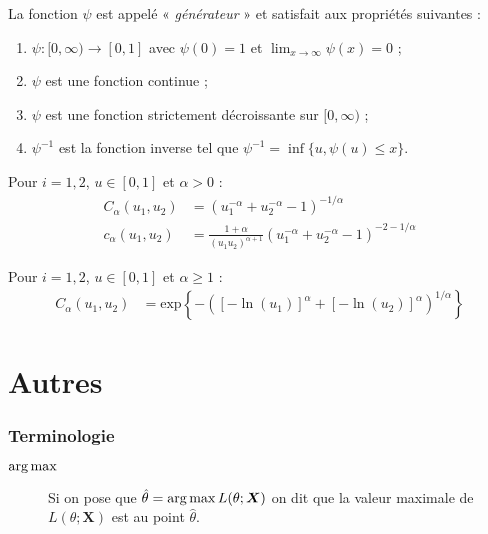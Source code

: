 \documentclass[10pt, french]{article}
\begin{document}
\begin{multicols*}{2}
\begin{definitionNOHFILL}
La fonction $\psi$ est appelé « \textit{générateur} » et satisfait aux propriétés suivantes :
\begin{enumerate}[label	=	\circled{\arabic*}{trueblue}]
	\item	$\psi: [0, \infty) \rightarrow [0, 1]$ avec $\psi(0) = 1$ et $\lim_{x \rightarrow \infty} \psi(x) = 0$ ;
	\item	$\psi$ est une fonction continue ;
	\item	$\psi$ est une fonction strictement décroissante sur $[0, \infty)$ ;
	\item	$\psi^{-1}$ est la fonction inverse tel que $\psi^{-1} = \inf\{u, \psi(u) \leq x\}$.
\end{enumerate}
\end{definitionNOHFILL}


\begin{definitionNOHFILLsub}
Pour $i = 1, 2$, $u \in [0, 1]$ et $\alpha > 0$ :
\begin{align*}
	C_{\alpha}(u_{1}, u_{2})
	&=	\left(u_{1}^{-\alpha} + u_{2}^{-\alpha} - 1\right)^{-1/\alpha}	\\
	c_{\alpha}(u_{1}, u_{2})
	&=	\frac{1 + \alpha}{(u_{1}u_{2})^{\alpha + 1}} \left(u_{1}^{-\alpha} + u_{2}^{-\alpha} - 1\right)^{-2 - 1/\alpha}	
\end{align*}
\end{definitionNOHFILLsub}

\begin{definitionNOHFILLsub}
Pour $i = 1, 2$, $u \in [0, 1]$ et $\alpha \geq 1$ :
\begin{align*}
	C_{\alpha}(u_{1}, u_{2})
	&=	\textrm{exp}\left\{-\left([-\ln(u_{1})]^{\alpha} + [-\ln(u_{2})]^{\alpha}\right)^{1/\alpha}\right\}	
\end{align*}
\end{definitionNOHFILLsub}


\newpage
\part{Autres}
\section{Terminologie}
\begin{description}
	\item[$\operatorname*{arg\,max}$]	Si on pose que $\hat{\theta}	=	\operatorname*{arg\,max} L(\theta; \bm{X})$ on dit que la valeur maximale de $L(\theta; \bm{X})$ est au point $\hat{\theta}$.
\end{description}


\end{multicols*}
\end{document}
